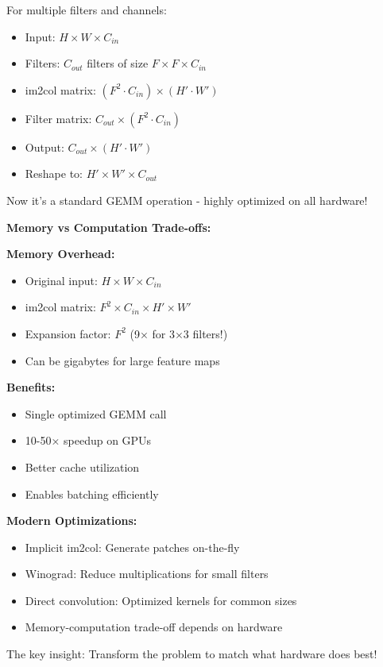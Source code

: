\documentclass[12pt]{article}
\newcommand{\explanation}[1]{{\color{explanationcolor}#1}}
\begin{document}
\begin{enumerate}[(a)]
{    \explanation{
    For multiple filters and channels:
    \begin{itemize}
        \item Input: $H \times W \times C_{in}$
        \item Filters: $C_{out}$ filters of size $F \times F \times C_{in}$
        \item im2col matrix: $(F^2 \cdot C_{in}) \times (H' \cdot W')$
        \item Filter matrix: $C_{out} \times (F^2 \cdot C_{in})$
        \item Output: $C_{out} \times (H' \cdot W')$
        \item Reshape to: $H' \times W' \times C_{out}$
    \end{itemize}
    
    Now it's a standard GEMM operation - highly optimized on all hardware!
    }
    
    \textbf{Memory vs Computation Trade-offs:}
    
    \explanation{
    \textbf{Memory Overhead:}
    \begin{itemize}
        \item Original input: $H \times W \times C_{in}$
        \item im2col matrix: $F^2 \times C_{in} \times H' \times W'$
        \item Expansion factor: $F^2$ (9× for 3×3 filters!)
        \item Can be gigabytes for large feature maps
    \end{itemize}
    
    \textbf{Benefits:}
    \begin{itemize}
        \item Single optimized GEMM call
        \item 10-50× speedup on GPUs
        \item Better cache utilization
        \item Enables batching efficiently
    \end{itemize}
    
    \textbf{Modern Optimizations:}
    \begin{itemize}
        \item Implicit im2col: Generate patches on-the-fly
        \item Winograd: Reduce multiplications for small filters
        \item Direct convolution: Optimized kernels for common sizes
        \item Memory-computation trade-off depends on hardware
    \end{itemize}
    
    The key insight: Transform the problem to match what hardware does best!
    }
    }
\end{enumerate}
\end{document}
